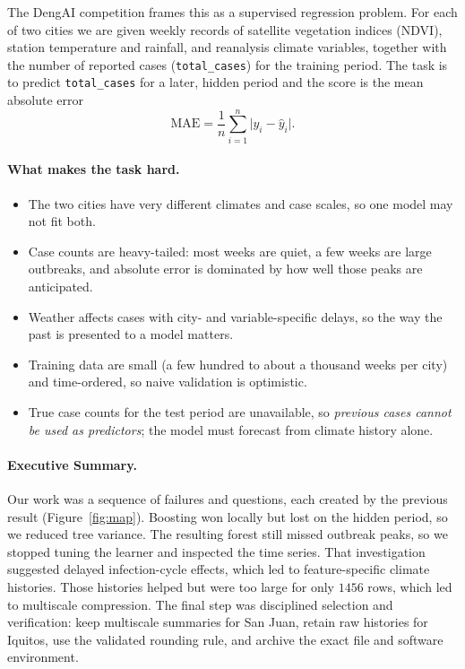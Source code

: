 \documentclass[11pt,a4paper]{article}
\newcommand{\MAE}{\mathrm{MAE}}
\begin{document}
The DengAI competition \cite{drivendata} frames this as a supervised regression problem. For each of two cities we are given weekly records of satellite vegetation indices (NDVI), station temperature and rainfall, and reanalysis climate variables, together with the number of reported cases (\texttt{total\_cases}) for the training period. The task is to predict \texttt{total\_cases} for a later, hidden period and the score is the mean absolute error
\begin{equation}
\MAE = \frac{1}{n}\sum_{i=1}^{n}\lvert y_i-\hat y_i\rvert .
\end{equation}

\paragraph{What makes the task hard.}
\begin{itemize}
  \item The two cities have very different climates and case scales, so one model may not fit both.
  \item Case counts are heavy-tailed: most weeks are quiet, a few weeks are large outbreaks, and absolute error is dominated by how well those peaks are anticipated.
  \item Weather affects cases with city- and variable-specific delays, so the way the past is presented to a model matters.
  \item Training data are small (a few hundred to about a thousand weeks per city) and time-ordered, so naive validation is optimistic.
  \item True case counts for the test period are unavailable, so \emph{previous cases cannot be used as predictors}; the model must forecast from climate history alone.
\end{itemize}

\paragraph{Executive Summary.}
Our work was a sequence of failures and questions, each created by the previous result (Figure~\ref{fig:map}). Boosting won locally but lost on the hidden period, so we reduced tree variance. The resulting forest still missed outbreak peaks, so we stopped tuning the learner and inspected the time series. That investigation suggested delayed infection-cycle effects, which led to feature-specific climate histories. Those histories helped but were too large for only $1456$ rows, which led to multiscale compression. The final step was disciplined selection and verification: keep multiscale summaries for San Juan, retain raw histories for Iquitos, use the validated rounding rule, and archive the exact file and software environment.
\end{document}
